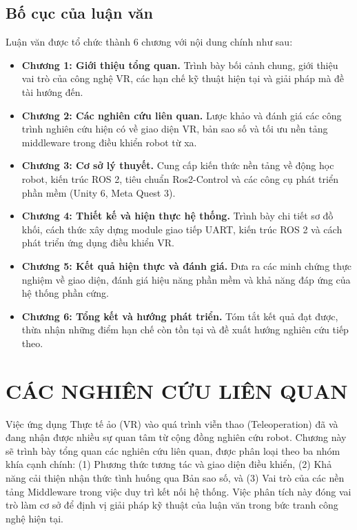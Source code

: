 \section{Bố cục của luận văn}
Luận văn được tổ chức thành 6 chương với nội dung chính như sau:
\begin{itemize}
    \item \textbf{Chương 1: Giới thiệu tổng quan.} Trình bày bối cảnh chung, giới thiệu vai trò của công nghệ VR, các hạn chế kỹ thuật hiện tại và giải pháp mà đề tài hướng đến.
    \item \textbf{Chương 2: Các nghiên cứu liên quan.} Lược khảo và đánh giá các công trình nghiên cứu hiện có về giao diện VR, bản sao số và tối ưu nền tảng middleware trong điều khiển robot từ xa.
    \item \textbf{Chương 3: Cơ sở lý thuyết.} Cung cấp kiến thức nền tảng về động học robot, kiến trúc ROS 2, tiêu chuẩn Ros2-Control và các công cụ phát triển phần mềm (Unity 6, Meta Quest 3).
    \item \textbf{Chương 4: Thiết kế và hiện thực hệ thống.} Trình bày chi tiết sơ đồ khối, cách thức xây dựng module giao tiếp UART, kiến trúc ROS 2 và cách phát triển ứng dụng điều khiển VR.
    \item \textbf{Chương 5: Kết quả hiện thực và đánh giá.} Đưa ra các minh chứng thực nghiệm về giao diện, đánh giá hiệu năng phần mềm và khả năng đáp ứng của hệ thống phần cứng.
    \item \textbf{Chương 6: Tổng kết và hướng phát triển.} Tóm tắt kết quả đạt được, thừa nhận những điểm hạn chế còn tồn tại và đề xuất hướng nghiên cứu tiếp theo.
\end{itemize}


\chapter{CÁC NGHIÊN CỨU LIÊN QUAN}
\label{chap:related_works}

Việc ứng dụng Thực tế ảo (VR) vào quá trình viễn thao (Teleoperation) đã và đang nhận được nhiều sự quan tâm từ cộng đồng nghiên cứu robot. Chương này sẽ trình bày tổng quan các nghiên cứu liên quan, được phân loại theo ba nhóm khía cạnh chính: (1) Phương thức tương tác và giao diện điều khiển, (2) Khả năng cải thiện nhận thức tình huống qua Bản sao số, và (3) Vai trò của các nền tảng Middleware trong việc duy trì kết nối hệ thống. Việc phân tích này đóng vai trò làm cơ sở để định vị giải pháp kỹ thuật của luận văn trong bức tranh công nghệ hiện tại.

